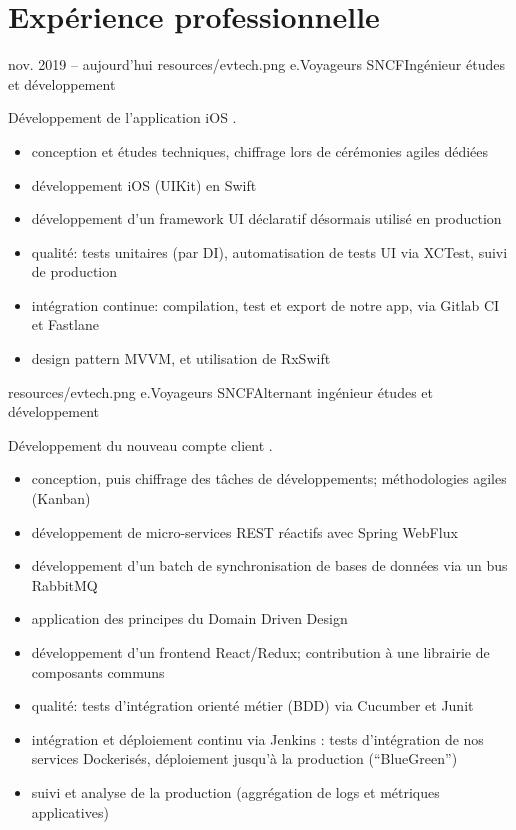 \documentclass{cv}
\begin{document}
\section{Expérience professionnelle}

\experience
{{nov. 2019 -- aujourd'hui}}
{resources/evtech.png}
{e.Voyageurs SNCF}{Ingénieur études et développement}{

Développement de l'application iOS \href{https://apps.apple.com/fr/app/oui-sncf-train-et-bus/id343889987}{\link{\ouisncf{}}}.

\begin{itemize}
	\item conception et études techniques, chiffrage lors de cérémonies agiles dédiées
	\item développement iOS (UIKit) en Swift
	\item développement d'un framework UI déclaratif désormais utilisé en production
	\item qualité: tests unitaires (par DI), automatisation de tests UI via XCTest, suivi de production
	\item intégration continue: compilation, test et export de notre app, via Gitlab CI et Fastlane
	\item design pattern MVVM, et utilisation de RxSwift
\end{itemize}
}

{resources/evtech.png}
{e.Voyageurs SNCF}{Alternant ingénieur études et développement}{

Développement du nouveau compte client \ouisncf{}. 

\begin{itemize}
	\item conception, puis chiffrage des tâches de développements; méthodologies agiles (Kanban)
	\item développement de micro-services REST réactifs avec Spring WebFlux
	\item développement d'un batch de synchronisation de bases de données via un bus RabbitMQ
	\item application des principes du Domain Driven Design
	\item développement d'un frontend React/Redux; contribution à une librairie de composants communs
	\item qualité: tests d'intégration orienté métier (BDD) via Cucumber et Junit
	\item intégration et déploiement continu via Jenkins : tests d'intégration de nos services Dockerisés, 
	déploiement jusqu'à la production (``BlueGreen'')
	\item suivi et analyse de la production (aggrégation de logs et métriques applicatives)
\end{itemize}
}
\end{document}
